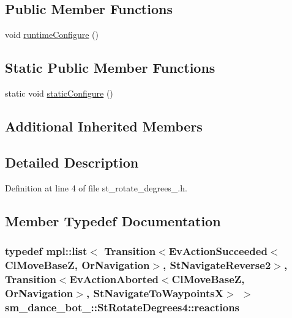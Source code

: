 \subsection*{Public Member Functions}
\begin{DoxyCompactItemize}
\item 
void \hyperlink{structsm__dance__bot__3_1_1StRotateDegrees4_aed1a3fd7f1fbe4389a5e6b4663a1df47}{runtime\+Configure} ()
\end{DoxyCompactItemize}
\subsection*{Static Public Member Functions}
\begin{DoxyCompactItemize}
\item 
static void \hyperlink{structsm__dance__bot__3_1_1StRotateDegrees4_a0415d1e13c9baecc2abff3ed0345d8bb}{static\+Configure} ()
\end{DoxyCompactItemize}
\subsection*{Additional Inherited Members}


\subsection{Detailed Description}


Definition at line 4 of file st\+\_\+rotate\+\_\+degrees\+\_.\+h.



\subsection{Member Typedef Documentation}
\subsubsection[{\texorpdfstring{reactions}{reactions}}]{\setlength{\rightskip}{0pt plus 5cm}typedef mpl\+::list$<$ Transition$<$Ev\+Action\+Succeeded$<${\bf Cl\+Move\+BaseZ}, {\bf Or\+Navigation}$>$, {\bf St\+Navigate\+Reverse2}$>$, Transition$<$Ev\+Action\+Aborted$<${\bf Cl\+Move\+BaseZ}, {\bf Or\+Navigation}$>$, {\bf St\+Navigate\+To\+WaypointsX}$>$ $>$ {\bf sm\+\_\+dance\+\_\+bot\+\_\+::\+St\+Rotate\+Degrees4\+::reactions}}\hypertarget{structsm__dance__bot__3_1_1StRotateDegrees4_afe142f688a5c9c61206a3c47024e0a35}{}\label{structsm__dance__bot__3_1_1StRotateDegrees4_afe142f688a5c9c61206a3c47024e0a35}


